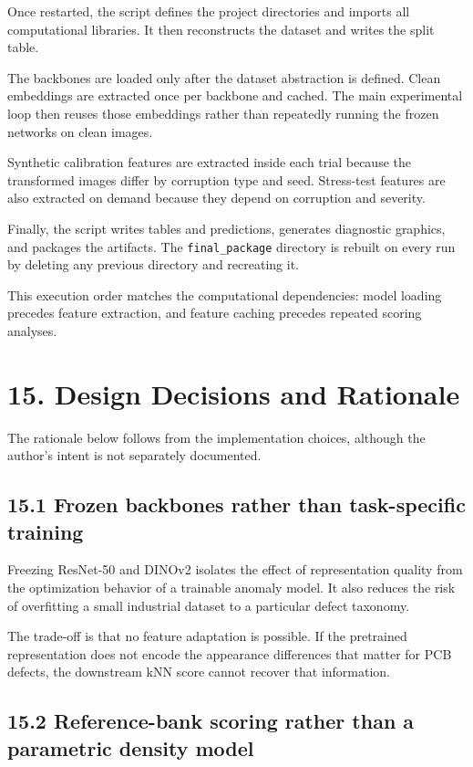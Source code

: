 \documentclass[
  11pt,
]{article}
\begin{document}
Once restarted, the script defines the project directories and imports
all computational libraries. It then reconstructs the dataset and writes
the split table.

The backbones are loaded only after the dataset abstraction is defined.
Clean embeddings are extracted once per backbone and cached. The main
experimental loop then reuses those embeddings rather than repeatedly
running the frozen networks on clean images.

Synthetic calibration features are extracted inside each trial because
the transformed images differ by corruption type and seed. Stress-test
features are also extracted on demand because they depend on corruption
and severity.

Finally, the script writes tables and predictions, generates diagnostic
graphics, and packages the artifacts. The \texttt{final\_package}
directory is rebuilt on every run by deleting any previous directory and
recreating it.

This execution order matches the computational dependencies: model
loading precedes feature extraction, and feature caching precedes
repeated scoring analyses.

\section{15. Design Decisions and
Rationale}\label{design-decisions-and-rationale}

The rationale below follows from the implementation choices, although the
author's intent is not separately documented.

\subsection{15.1 Frozen backbones rather than task-specific
training}\label{frozen-backbones-rather-than-task-specific-training}

Freezing ResNet-50 and DINOv2 isolates the effect of representation
quality from the optimization behavior of a trainable anomaly model. It
also reduces the risk of overfitting a small industrial dataset to a
particular defect taxonomy.

The trade-off is that no feature adaptation is possible. If the
pretrained representation does not encode the appearance differences
that matter for PCB defects, the downstream kNN score cannot recover
that information.

\subsection{15.2 Reference-bank scoring rather than a parametric density
model}\label{reference-bank-scoring-rather-than-a-parametric-density-model}
\end{document}
